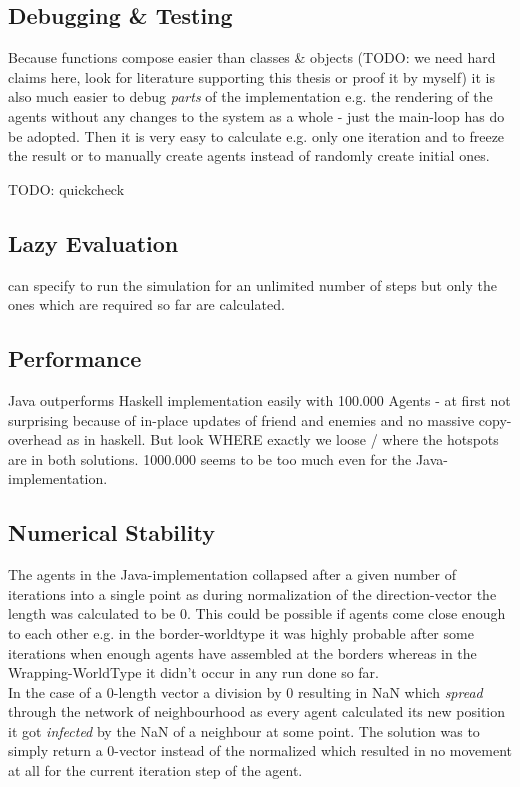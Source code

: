 \subsection{Debugging \& Testing}
Because functions compose easier than classes \& objects (TODO: we need hard claims here, look for literature supporting this thesis or proof it by myself) it is also much easier to debug \textit{parts} of the implementation e.g. the rendering of the agents without any changes to the system as a whole - just the main-loop has do be adopted. Then it is very easy to calculate e.g. only one iteration and to freeze the result or to manually create agents instead of randomly create initial ones.

TODO: quickcheck


\subsection{Lazy Evaluation}
can specify to run the simulation for an unlimited number of steps but only the ones which are required so far are calculated.

\subsection{Performance}
Java outperforms Haskell implementation easily with 100.000 Agents - at first not surprising because of in-place updates of friend and enemies and no massive copy-overhead as in haskell. But look WHERE exactly we loose / where the hotspots are in both solutions. 1000.000 seems to be too much even for the Java-implementation.

\subsection{Numerical Stability}
The agents in the Java-implementation collapsed after a given number of iterations into a single point as during normalization of the direction-vector the length was calculated to be 0. This could be possible if agents come close enough to each other e.g. in the border-worldtype it was highly probable after some iterations when enough agents have assembled at the borders whereas in the Wrapping-WorldType it didn't occur in any run done so far. \\
In the case of a 0-length vector a division by 0  resulting in NaN which \textit{spread} through the network of neighbourhood as every agent calculated its new position it got \textit{infected} by the NaN of a neighbour at some point. The solution was to simply return a 0-vector instead of the normalized which resulted in no movement at all for the current iteration step of the agent. 


